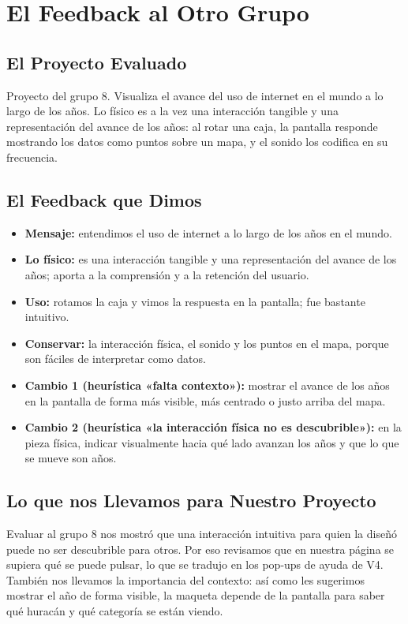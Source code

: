 \documentclass[11pt,a4paper]{article}
\begin{document}
	\section{El Feedback al Otro Grupo}

	\subsection{El Proyecto Evaluado}
	Proyecto del grupo 8. Visualiza el avance del uso de internet en el mundo a lo largo de los años. Lo físico es a la vez una interacción tangible y una representación del avance de los años: al rotar una caja, la pantalla responde mostrando los datos como puntos sobre un mapa, y el sonido los codifica en su frecuencia.

	\subsection{El Feedback que Dimos}
	\begin{itemize}
		\item \textbf{Mensaje:} entendimos el uso de internet a lo largo de los años en el mundo.
		\item \textbf{Lo físico:} es una interacción tangible y una representación del avance de los años; aporta a la comprensión y a la retención del usuario.
		\item \textbf{Uso:} rotamos la caja y vimos la respuesta en la pantalla; fue bastante intuitivo.
		\item \textbf{Conservar:} la interacción física, el sonido y los puntos en el mapa, porque son fáciles de interpretar como datos.
		\item \textbf{Cambio 1 (heurística «falta contexto»):} mostrar el avance de los años en la pantalla de forma más visible, más centrado o justo arriba del mapa.
		\item \textbf{Cambio 2 (heurística «la interacción física no es descubrible»):} en la pieza física, indicar visualmente hacia qué lado avanzan los años y que lo que se mueve son años.
	\end{itemize}

	\subsection{Lo que nos Llevamos para Nuestro Proyecto}
	Evaluar al grupo 8 nos mostró que una interacción intuitiva para quien la diseñó puede no ser descubrible para otros. Por eso revisamos que en nuestra página se supiera qué se puede pulsar, lo que se tradujo en los pop-ups de ayuda de V4. También nos llevamos la importancia del contexto: así como les sugerimos mostrar el año de forma visible, la maqueta depende de la pantalla para saber qué huracán y qué categoría se están viendo.
\end{document}
